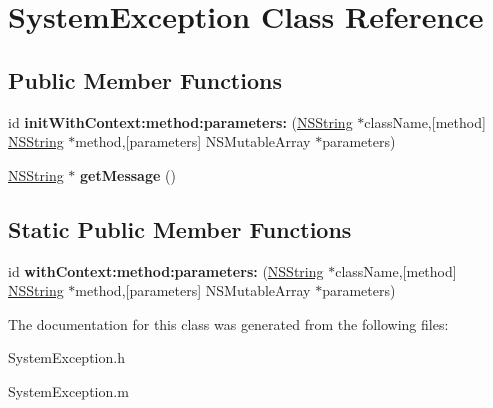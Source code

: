 \hypertarget{interface_system_exception}{
\section{\-System\-Exception \-Class \-Reference}
\label{interface_system_exception}
}
\subsection*{\-Public \-Member \-Functions}
\begin{DoxyCompactItemize}
\item 
\hypertarget{interface_system_exception_a89e9a2347ac5ed2b8c48b7dac9fa1975}{
id {\bfseries init\-With\-Context\-:method\-:parameters\-:} (\hyperlink{class_n_s_string}{\-N\-S\-String} $\ast$class\-Name,\mbox{[}method\mbox{]} \hyperlink{class_n_s_string}{\-N\-S\-String} $\ast$method,\mbox{[}parameters\mbox{]} \-N\-S\-Mutable\-Array $\ast$parameters)}
\label{interface_system_exception_a89e9a2347ac5ed2b8c48b7dac9fa1975}

\item 
\hypertarget{interface_system_exception_a5502e14d754e79050e3b3cfe7c17555e}{
\hyperlink{class_n_s_string}{\-N\-S\-String} $\ast$ {\bfseries get\-Message} ()}
\label{interface_system_exception_a5502e14d754e79050e3b3cfe7c17555e}

\end{DoxyCompactItemize}
\subsection*{\-Static \-Public \-Member \-Functions}
\begin{DoxyCompactItemize}
\item 
\hypertarget{interface_system_exception_a58f05bab866c80fe68ec6b65a4b8a364}{
id {\bfseries with\-Context\-:method\-:parameters\-:} (\hyperlink{class_n_s_string}{\-N\-S\-String} $\ast$class\-Name,\mbox{[}method\mbox{]} \hyperlink{class_n_s_string}{\-N\-S\-String} $\ast$method,\mbox{[}parameters\mbox{]} \-N\-S\-Mutable\-Array $\ast$parameters)}
\label{interface_system_exception_a58f05bab866c80fe68ec6b65a4b8a364}

\end{DoxyCompactItemize}


\-The documentation for this class was generated from the following files\-:\begin{DoxyCompactItemize}
\item 
\-System\-Exception.\-h\item 
\-System\-Exception.\-m\end{DoxyCompactItemize}
